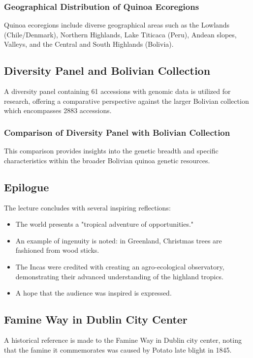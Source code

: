 \subsubsection*{Geographical Distribution of Quinoa Ecoregions} 
Quinoa ecoregions include diverse geographical areas such as the Lowlands (Chile/Denmark), Northern Highlands, Lake Titicaca (Peru), Andean slopes, Valleys, and the Central and South Highlands (Bolivia).

\subsection{Diversity Panel and Bolivian Collection} 
A diversity panel containing 61 accessions with genomic data is utilized for research, offering a comparative perspective against the larger Bolivian collection which encompasses 2883 accessions.

\subsubsection*{Comparison of Diversity Panel with Bolivian Collection} 
This comparison provides insights into the genetic breadth and specific characteristics within the broader Bolivian quinoa genetic resources.

\subsection{Epilogue} 
The lecture concludes with several inspiring reflections: 
\begin{itemize} 
    \item The world presents a "tropical adventure of opportunities." 
    \item An example of ingenuity is noted: in Greenland, Christmas trees are fashioned from wood sticks. 
    \item The Incas were credited with creating an agro-ecological observatory, demonstrating their advanced understanding of the highland tropics. 
    \item A hope that the audience was inspired is expressed. 
\end{itemize}

\subsection{Famine Way in Dublin City Center} 
A historical reference is made to the Famine Way in Dublin city center, noting that the famine it commemorates was caused by Potato late blight in 1845.

